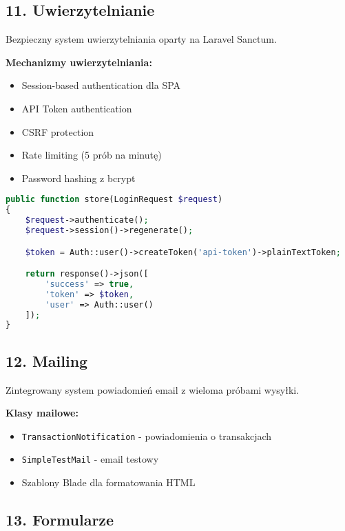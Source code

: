 \documentclass[12pt,a4paper]{article}
\begin{document}
    \subsection{11. Uwierzytelnianie}

    Bezpieczny system uwierzytelniania oparty na Laravel Sanctum.

    \textbf{Mechanizmy uwierzytelniania:}
    \begin{itemize}
        \item Session-based authentication dla SPA
        \item API Token authentication
        \item CSRF protection
        \item Rate limiting (5 prób na minutę)
        \item Password hashing z bcrypt
    \end{itemize}

    \begin{lstlisting}[language=PHP, caption=Implementacja logowania]
public function store(LoginRequest $request)
{
    $request->authenticate();
    $request->session()->regenerate();

    $token = Auth::user()->createToken('api-token')->plainTextToken;

    return response()->json([
        'success' => true,
        'token' => $token,
        'user' => Auth::user()
    ]);
}
    \end{lstlisting}

    \subsection{12. Mailing}

    Zintegrowany system powiadomień email z wieloma próbami wysyłki.

    \textbf{Klasy mailowe:}
    \begin{itemize}
        \item \texttt{TransactionNotification} - powiadomienia o transakcjach
        \item \texttt{SimpleTestMail} - email testowy
        \item Szablony Blade dla formatowania HTML
    \end{itemize}

    \subsection{13. Formularze}
\end{document}
